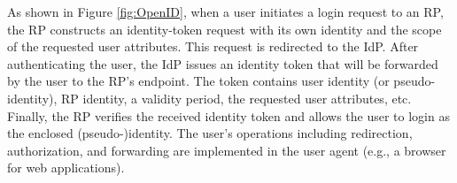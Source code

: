 As shown in Figure \ref{fig:OpenID}, when a user initiates a login request to an RP, the RP constructs an identity-token request with its own identity and the scope of the requested user attributes.
This request is redirected to the IdP.
After authenticating the user, the IdP issues an identity token that will be forwarded by the user to the RP's endpoint.
The token contains user identity (or pseudo-identity), RP identity, a validity period, the requested user attributes, etc.
Finally, the RP verifies the received identity token and allows the user to login as the  enclosed (pseudo-)identity.
The user's operations including redirection, authorization, and forwarding are implemented in the user agent (e.g., a browser for web applications).




